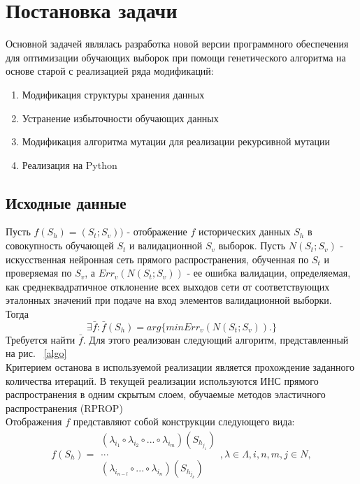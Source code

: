 \documentclass[utf8,usehyperref,12pt]{G7-32}
\begin{document}
\chapter{Постановка задачи}
Основной задачей являлась разработка новой версии программного обеспечения для оптимизации обучающих выборок при помощи генетического алгоритма на основе старой с реализацией ряда модификаций:
\begin{enumerate}
\item Модификация структуры хранения данных
\item Устранение избыточности обучающих данных
\item Модификация алгоритма мутации для реализации рекурсивной мутации
\item Реализация на Python
\end{enumerate}
\section{Исходные данные}
Пусть $ f(S_{h})=(S_{t}; S_{v})) $ - отображение $f$ исторических данных $S_{h}$ в совокупность обучающей $S_{t}$ и валидационной $S_{v}$ выборок. Пусть $ N(S_{t}; S_{v}) $ - искусственная нейронная сеть прямого распространения, обученная по $S_{t}$ и проверяемая по $S_{v}$, а $ Err_{v}(N(S_{t}; S_{v})) $ - ее ошибка валидации, определяемая, как среднеквадратичное отклонение всех выходов сети от соответствующих эталонных значений при подаче на вход элементов валидационной выборки. Тогда
\begin{equation}
\exists\bar{f}:\bar{f}(S_{h})=arg\{min Err_{v}(N(S_{t}; S_{v})). \}
\end{equation}
Требуется найти $ \bar{f} $. Для этого реализован следующий алгоритм, представленный на рис. ~\ref{algo} \\
Критерием останова в используемой реализации является прохождение заданного количества итераций. В текущей реализации используются ИНС прямого распространения в одним скрытым слоем, обучаемые методов эластичного распространения (RPROP)\\
Отображения $f$ представляют собой конструкции следующего вида:
\begin{equation}
f(S_{h})=\begin{array}{|c|}
(\lambda_{i_{1}} \circ \lambda_{i_{2}} \circ ... \circ \lambda_{i_{m}})(S_{h_{j_{1}}}) \\
...\\
(\lambda_{i_{n-l}} \circ ... \circ \lambda_{i_{n}})(S_{h_{j_{k}}})
\end{array}
, \lambda\in\Lambda, i,n,m,j\in N,
\end{equation}
\end{document}
